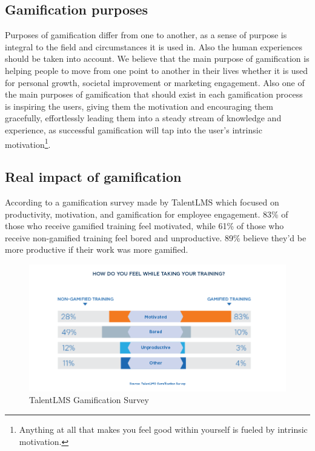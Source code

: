 \documentclass[../main.tex]{subfiles}
\begin{document}
\subsection{Gamification purposes}
Purposes of gamification differ from one to another, as a sense of purpose is integral to the field and circumstances it is used in. Also the human experiences should be taken into account. We believe that the main purpose of gamification is helping people to move from one point to another in their lives whether it is used for personal growth, societal improvement or marketing engagement. Also one of the main purposes of gamification that should exist in each gamification process is inspiring the users, giving them the motivation and encouraging them gracefully, effortlessly leading them into a steady stream of knowledge and experience, as successful gamification will tap into the user’s intrinsic motivation\footnote{Anything at all that makes you feel good within yourself is fueled by intrinsic motivation.}.
\subsection{Real impact of gamification}
According to a gamification survey made by TalentLMS which focused on productivity, motivation, and gamification for employee engagement. 83\% of those who receive gamified training feel motivated, while 61\% of those who receive non-gamified training feel bored and unproductive. 89\% believe they’d be more productive if their work was more gamified. \cite{5}
\begin{figure}[ht]
\centering
\includegraphics[scale=0.5]{images/chapter1/TalentLMS_Survey.png}
\caption{TalentLMS Gamification Survey}
\label{fig:TalentLMS gamification survey}
\end{figure}
\end{document}
